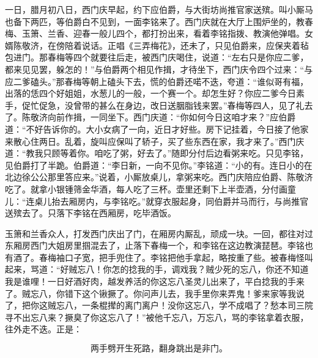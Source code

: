 一日，腊月初八日，西门庆早起，约下应伯爵，与大街坊尚推官家送殡。叫小厮马也备下两匹，等伯爵白不见到，一面李铭来了。西门庆就在大厅上围炉坐的，教春梅、玉箫、兰香、迎春一般儿四个，都打扮出来，看着李铭指拨、教演他弹唱。女婿陈敬济，在傍陪着说话。正唱《三弄梅花》，还未了，只见伯爵来，应保夹着毡包进门。那春梅等四个就要往后走，被西门庆喝住，说道：“左右只是你应二爹，都来见见罢，躲怎的！”与伯爵两个相见作揖，才待坐下，西门庆令四个过来：“与应二爹磕头。”那春梅等朝上磕头下去，慌的伯爵还喏不迭，夸道：“谁似哥有福，出落的恁四个好姐姐，水葱儿的一般，一个赛一个。却怎生好？你应二爹今日素手，促忙促急，没曾带的甚么在身边，改日送胭脂钱来罢。”春梅等四人，见了礼去了。陈敬济向前作揖，一同坐下。西门庆道：“你如何今日这咱才来？”应伯爵道：“不好告诉你的。大小女病了一向，近日才好些。房下记挂着，今日接了他家来散心住两日。乱着，旋叫应保叫了轿子，买了些东西在家，我才来了。”西门庆道：“教我只顾等着你。咱吃了粥，好去了。”随即分付后边看粥来吃。只见李铭，见伯爵打了半跪。伯爵道：“李日新，一向不见你。”李铭道：“小的有。连日小的在北边徐公公那里答应来。”说着，小厮放桌儿，拿粥来吃。西门庆陪应伯爵、陈敬济吃了。就拿小银锺筛金华酒，每人吃了三杯。壶里还剩下上半壶酒，分付画童儿：“连桌儿抬去厢房内，与李铭吃。”就穿衣服起身，同伯爵并马而行，与尚推官送殡去了。只落下李铭在西厢房，吃毕酒饭。

玉箫和兰香众人，打发西门庆出了门，在厢房内厮乱，顽成一块。一回，都往对过东厢房西门大姐房里掴混去了，止落下春梅一个，和李铭在这边教演琵琶。李铭也有酒了。春梅袖口子宽，把手兜住了。李铭把他手拿起，略按重了些。被春梅怪叫起来，骂道：“好贼忘八！你怎的捻我的手，调戏我？贼少死的忘八，你还不知道我是谁哩！一日好酒好肉，越发养活的你这忘八圣灵儿出来了，平白捻我的手来了。贼忘八，你错下这个锹撅了。你问声儿去，我手里你来弄鬼！爹来家等我说了，把你这贼忘八，一条棍撵的离门离户！没你这忘八，学不成唱了？愁本司三院寻不出忘八来？撅臭了你这忘八了！”被他千忘八，万忘八，骂的李铭拿着衣服，往外走不迭。正是：

\[
两手劈开生死路，翻身跳出是非门。
\]

